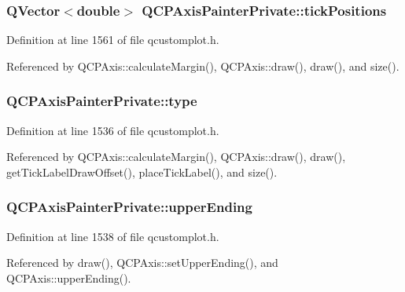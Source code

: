 \subsubsection[{tick\+Positions}]{\setlength{\rightskip}{0pt plus 5cm}Q\+Vector$<$double$>$ Q\+C\+P\+Axis\+Painter\+Private\+::tick\+Positions}\label{class_q_c_p_axis_painter_private_ae55e3dc2cf2af8d8a6e7235ccab54786}


Definition at line 1561 of file qcustomplot.\+h.



Referenced by Q\+C\+P\+Axis\+::calculate\+Margin(), Q\+C\+P\+Axis\+::draw(), draw(), and size().

\hypertarget{class_q_c_p_axis_painter_private_ae04594e97417336933d807c86d353098}{}
\subsubsection[{type}]{ Q\+C\+P\+Axis\+Painter\+Private\+::type}\label{class_q_c_p_axis_painter_private_ae04594e97417336933d807c86d353098}


Definition at line 1536 of file qcustomplot.\+h.



Referenced by Q\+C\+P\+Axis\+::calculate\+Margin(), Q\+C\+P\+Axis\+::draw(), draw(), get\+Tick\+Label\+Draw\+Offset(), place\+Tick\+Label(), and size().

\hypertarget{class_q_c_p_axis_painter_private_af764be913be5f924700ac9bbb8c01139}{}
\subsubsection[{upper\+Ending}]{ Q\+C\+P\+Axis\+Painter\+Private\+::upper\+Ending}\label{class_q_c_p_axis_painter_private_af764be913be5f924700ac9bbb8c01139}


Definition at line 1538 of file qcustomplot.\+h.



Referenced by draw(), Q\+C\+P\+Axis\+::set\+Upper\+Ending(), and Q\+C\+P\+Axis\+::upper\+Ending().

